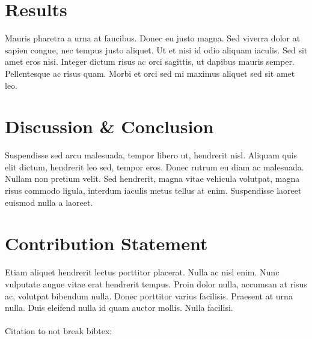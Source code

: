 \documentclass{article}
\theoremstyle{plain}
\theoremstyle{definition}
\theoremstyle{remark}
\begin{document}


\section{Results}\label{sec:results}


Mauris pharetra a urna at faucibus. Donec eu justo magna. Sed viverra dolor at sapien congue, nec tempus justo aliquet. Ut et nisi id odio aliquam iaculis. Sed sit amet eros nisi. Integer dictum risus ac orci sagittis, ut dapibus mauris semper. Pellentesque ac risus quam. Morbi et orci sed mi maximus aliquet sed sit amet leo. 


\section{Discussion \& Conclusion}\label{sec:conclusion}


Suspendisse sed arcu malesuada, tempor libero ut, hendrerit nisl. Aliquam quis elit dictum, hendrerit leo sed, tempor eros. Donec rutrum eu diam ac malesuada. Nullam non pretium velit. Sed hendrerit, magna vitae vehicula volutpat, magna risus commodo ligula, interdum iaculis metus tellus at enim. Suspendisse laoreet euismod nulla a laoreet.


\section*{Contribution Statement}

Etiam aliquet hendrerit lectus porttitor placerat. Nulla ac nisl enim. Nunc vulputate augue vitae erat hendrerit tempus. Proin dolor nulla, accumsan at risus ac, volutpat bibendum nulla. Donec porttitor varius facilisis. Praesent at urna nulla. Duis eleifend nulla id quam auctor mollis. Nulla facilisi.\\
\\
Citation to not break bibtex: \citep{mackay2003information}
\end{document}

